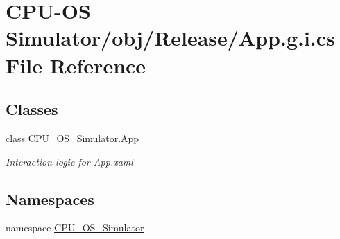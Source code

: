 \hypertarget{_c_p_u-_o_s_01_simulator_2obj_2_release_2_app_8g_8i_8cs}{}\section{C\+P\+U-\/\+O\+S Simulator/obj/\+Release/\+App.g.\+i.\+cs File Reference}
\label{_c_p_u-_o_s_01_simulator_2obj_2_release_2_app_8g_8i_8cs}
\subsection*{Classes}
\begin{DoxyCompactItemize}
\item 
class \hyperlink{class_c_p_u___o_s___simulator_1_1_app}{C\+P\+U\+\_\+\+O\+S\+\_\+\+Simulator.\+App}
\begin{DoxyCompactList}\small\item\em Interaction logic for App.\+xaml \end{DoxyCompactList}\end{DoxyCompactItemize}
\subsection*{Namespaces}
\begin{DoxyCompactItemize}
\item 
namespace \hyperlink{namespace_c_p_u___o_s___simulator}{C\+P\+U\+\_\+\+O\+S\+\_\+\+Simulator}
\end{DoxyCompactItemize}
